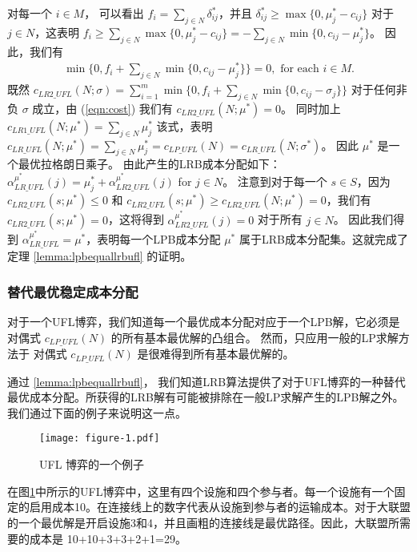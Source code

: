 \documentclass[UTF8]{article}
\begin{document}
\begin{定义}
      对每一个 $i\in M$， 可以看出 $f_i = \sum_{j\in N}\delta^*_{ij}$，并且 $\delta^*_{ij}\geq \max\{0,\mu^*_j-c_{ij}\}$ 对于 $j \in N$，这表明 $f_i \geq \sum_{j\in N}\max\{0,\mu^*_j-c_{ij}\}=-\sum_{j\in N}\min\{0,c_{ij}-\mu^*_j\}$。
      因此，我们有
      \begin{eqnarray}
        \min\{0,f_i + \sum_{j\in N}\min\{0,c_{ij}-\mu^*_j\}\} =0, \mbox{ for each $i\in M$.} \label{eqn:cost}
      \end{eqnarray}
      既然 $c_{LR2\_UFL}(N;\sigma)=\sum_{i=1}^{m}\min\{0,f_i+\sum_{j\in N}\min\{0,c_{ij}-\sigma_{j}\}\}$ 对于任何非负 $\sigma$ 成立，由 (\ref{eqn:cost}) 我们有 $c_{LR2\_UFL}(N;\mu^*) = 0$。
      同时加上 $c_{LR1\_UFL}(N;\mu^*)=\sum_{j\in N}\mu^*_j$ 该式，表明 $c_{LR\_UFL}(N;\mu^*) = \sum_{j\in N}\mu^*_j = c_{LP\_UFL}(N)=c_{LR\_UFL}(N;\sigma^*)$。
      因此 $\mu^*$ 是一个最优拉格朗日乘子。
      由此产生的LRB成本分配如下：$\alpha^{\mu^*}_{LR\_UFL}(j) = \mu^*_j + \alpha^{\mu^*}_{LR2\_UFL}(j)$ for $j \in N$。
      注意到对于每一个 $s\in S$，因为 $c_{LR2\_UFL}(s;\mu^*)\leq 0$ 和 $c_{LR2\_UFL}(s;\mu^*)\geq c_{LR2\_UFL}(N;\mu^*)=0$，我们有 $c_{LR2\_UFL}(s;\mu^*)=0$，这将得到 $\alpha^{\mu^*}_{LR2\_UFL}(j) = 0$ 对于所有 $j\in N$。
      因此我们得到 $\alpha^{\mu^*}_{LR\_UFL} = \mu^*$，表明每一个LPB成本分配 $\mu^*$ 属于LRB成本分配集。这就完成了定理
      \ref{lemma:lpbequallrbufl} 的证明。
      \hfill\Halmos

      \subsubsection{替代最优稳定成本分配}\label{section:uflcomputation}
      对于一个UFL博弈，我们知道每一个最优成本分配对应于一个LPB解，它必须是对偶式 $c_{LP\_UFL}(N)$ 的所有基本最优解的凸组合。 然而，只应用一般的LP求解方法于 对偶式 $c_{LP\_UFL}(N)$ 是很难得到所有基本最优解的。

      通过 \ref{lemma:lpbequallrbufl}， 我们知道LRB算法提供了对于UFL博弈的一种替代最优成本分配。所获得的LRB解有可能被排除在一般LP求解产生的LPB解之外。我们通过下面的例子来说明这一点。

      \begin{figure}[H]
      \centering
      \vspace{-0.1em}
      \texttt{[image: figure-1.pdf]}
      \caption{\label{figure:exampleUFL} UFL 博弈的一个例子}
      \vspace{-3mm}
      \end{figure}

      在图\ref{figure:exampleUFL}中所示的UFL博弈中，这里有四个设施和四个参与者。每一个设施有一个固定的启用成本10。在连接线上的数字代表从设施到参与者的运输成本。对于大联盟的一个最优解是开启设施3和4，并且画粗的连接线是最优路径。因此，大联盟所需要的成本是 10+10+3+3+2+1=29。


\end{定义}
\end{document}
